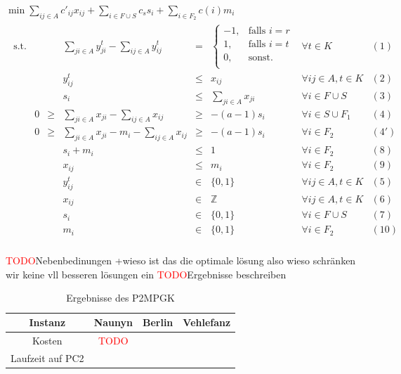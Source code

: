 \documentclass[11pt,a4paper]{article}
\newcommand{\Z}{\mathbb{Z}}
\newcommand{\TODO}{\textcolor{red}{TODO}}
\theoremstyle{my_th_style1}
\begin{document}
  \bigskip
  $\min \displaystyle\sum_{ij \in A} c'_{ij} x_{ij} + \displaystyle\sum_{i \in F \cup S} c_s s_i + \displaystyle\sum_{i \in F_2} c(i) m_i$
  \begin{align*}
  \begin{array}{rcrcrcll}
  \textrm{s.t.}  
  && &\displaystyle\sum_{ji \in A} y_{ji}^t - \displaystyle\sum_{ij \in A} y_{ij}^t& = & \left\{\begin{array}{cl} 
  -1, & \text{falls } i=r\\ 
  1, & \text{falls } i=t\\ 
  0, & \text{sonst.}\\ 
  \end{array}
  \right. & \forall t \in K & (1) \\
  &&& y_{ij}^t & \leq & x_{ij} & \forall ij \in A, t\in K & (2)\\
    &&& s_i &\leq& \displaystyle\sum_{ji \in A} x_{ji}& \forall  i \in F \cup S & (3)\\ 
  &0&\geq&\displaystyle\sum_{ji \in A} x_{ji} - \displaystyle\sum_{ij \in A} x_{ij}&\geq& -(a-1)s_i & \forall i \in S \cup F_1& (4)\\
   &0&\geq&\displaystyle\sum_{ji \in A} x_{ji} -m_i - \displaystyle\sum_{ij \in A} x_{ij}&\geq& -(a-1)s_i & \forall i \in F_2& (4')\\
   &&&s_i+m_i & \leq & 1 & \forall i \in F_2 & (8)\\
   &&&x_{ij}& \leq & m_i & \forall i \in F_2 & (9) \\
    &&& y_{ij}^t & \in & \{0,1 \}& \forall ij \in A, t \in K & (5)\\
    &&& x_{ij} & \in & \Z & \forall ij \in A, t \in K & (6)\\
    &&& s_i & \in & \{ 0,1 \} & \forall i \in F \cup S & (7) \\
    &&& m_i & \in & \{ 0,1 \} & \forall i \in F_2 & (10) \\
  \end{array}
  \end{align*}
  
   \TODO Nebenbedinungen  +wieso ist das die optimale lösung also wieso schränken wir keine vll besseren lösungen ein
   \TODO Ergebnisse beschreiben
   \begin{table}[h]
   	\centering
   	\begin{tabular}{c|c|c|c}
   		Instanz & Naunyn & Berlin & Vehlefanz \\	
   		\hline
   		Kosten & \TODO &  &  \\
   		Laufzeit auf PC2 &  &  & \\
   	\end{tabular}
   	\label{P2MPGK}
   	\caption{Ergebnisse des P2MPGK} 
   \end{table}
   
\end{document}

